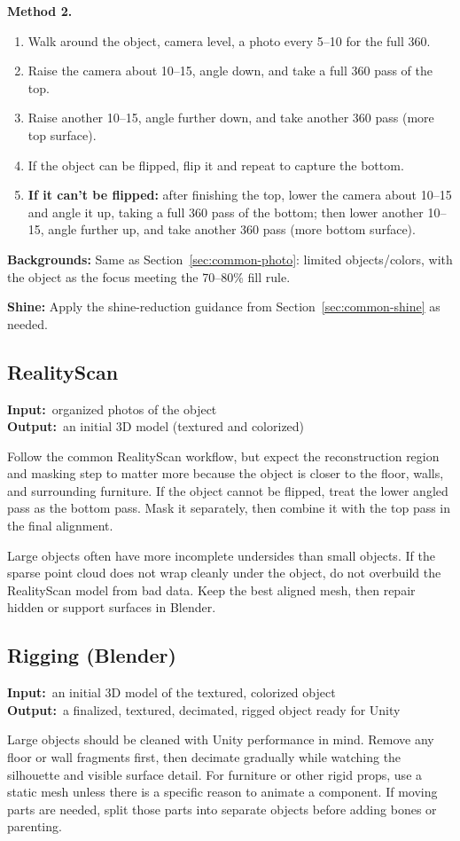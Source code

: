 \documentclass[11pt]{article}
\newcommand{\inout}[2]{%
    \begin{stageio}%
    \textbf{Input:}~#1\\[2pt]%
    \textbf{Output:}~#2%
    \end{stageio}%
}
\begin{document}
\textbf{Method 2.}
\begin{enumerate}[leftmargin=1.6em]
  \item Walk around the object, camera level, a photo every 5--10\textdegree{} for the full 360\textdegree.
  \item Raise the camera about 10--15\textdegree{}, angle down, and take a full 360\textdegree{} pass of the top.
  \item Raise another 10--15\textdegree{}, angle further down, and take another 360\textdegree{} pass (more top surface).
  \item If the object can be flipped, flip it and repeat to capture the bottom.
  \item \textbf{If it can't be flipped:} after finishing the top, lower the camera about 10--15\textdegree{} and angle it up, taking a full 360\textdegree{} pass of the bottom; then lower another 10--15\textdegree{}, angle further up, and take another 360\textdegree{} pass (more bottom surface).
\end{enumerate}

\textbf{Backgrounds:} Same as Section~\ref{sec:common-photo}: limited objects/colors, with the object as the focus meeting the 70--80\% fill rule.

\textbf{Shine:} Apply the shine-reduction guidance from Section~\ref{sec:common-shine} as needed.

\subsection{RealityScan}
\inout{organized photos of the object}{an initial 3D model (textured and colorized)}
Follow the common RealityScan workflow, but expect the reconstruction region and masking step to matter more because the object is closer to the floor, walls, and surrounding furniture. If the object cannot be flipped, treat the lower angled pass as the bottom pass. Mask it separately, then combine it with the top pass in the final alignment.

\noindent Large objects often have more incomplete undersides than small objects. If the sparse point cloud does not wrap cleanly under the object, do not overbuild the RealityScan model from bad data. Keep the best aligned mesh, then repair hidden or support surfaces in Blender.

\subsection{Rigging (Blender)}
\inout{an initial 3D model of the textured, colorized object}{a finalized, textured, decimated, rigged object ready for Unity}
Large objects should be cleaned with Unity performance in mind. Remove any floor or wall fragments first, then decimate gradually while watching the silhouette and visible surface detail. For furniture or other rigid props, use a static mesh unless there is a specific reason to animate a component. If moving parts are needed, split those parts into separate objects before adding bones or parenting.
\end{document}
